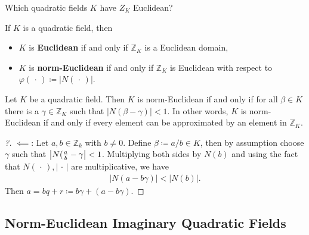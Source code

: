 \begin{question}

Which quadratic fields \(K\) have \(Z_K\) Euclidean?

\end{question}

\begin{definition}

If \(K\) is a quadratic field, then

\begin{itemize}
\item
  \(K\) is \textbf{Euclidean} if and only if \({\mathbb{Z}}_K\) is a
  Euclidean domain,
\item
  \(K\) is \textbf{norm-Euclidean} if and only if \({\mathbb{Z}}_K\) is
  Euclidean with respect to
  \(\varphi({\,\cdot\,}) \coloneqq{\left\lvert {N({\,\cdot\,})} \right\rvert}\).
\end{itemize}

\end{definition}

\begin{proposition}

Let \(K\) be a quadratic field. Then \(K\) is norm-Euclidean if and only
if for all \(\beta\in K\) there is a \(\gamma\in {\mathbb{Z}}_K\) such
that \({\left\lvert { N(\beta- \gamma) } \right\rvert} < 1\). In other
words, \(K\) is norm-Euclidean if and only if every element can be
approximated by an element in \({\mathbb{Z}}_K\).

\end{proposition}

\begin{proof}[?]

\(\impliedby\): Let \(a,b \in {\mathbb{Z}}_k\) with \(b\neq 0\). Define
\(\beta\coloneqq a/b \in K\), then by assumption choose \(\gamma\) such
that \({\left\lvert {N({a\over b} - \gamma} \right\rvert}< 1\).
Multiplying both sides by \(N(b)\) and using the fact that
\(N({\,\cdot\,}), {\left\lvert {{\,\cdot\,}} \right\rvert}\) are
multiplicative, we have
\begin{align*}
{\left\lvert {N(a - b \gamma)} \right\rvert} < {\left\lvert {N(b)} \right\rvert} 
.\end{align*}
Then \(a = bq + r \coloneqq b \gamma + (a - b \gamma)\).

\end{proof}

\hypertarget{norm-euclidean-imaginary-quadratic-fields}{%
\subsection{Norm-Euclidean Imaginary Quadratic
Fields}\label{norm-euclidean-imaginary-quadratic-fields}}

